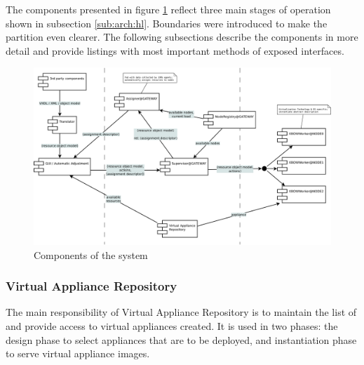 \documentclass[11pt]{book}
\begin{document}
        The components presented in figure \ref{fig:arch:comp} reflect three main stages of operation shown in
        subsection \ref{sub:arch:hl}. Boundaries were introduced to make the partition even clearer. The following
        subsections describe the components in more detail and provide listings with most important methods of exposed
        interfaces.

        \begin{figure}[H]
          \begin{center}
            \includegraphics[width=\textwidth]{img/architecture/iaas-components.pdf}
          \end{center}

          \caption{Components of the system}
          \label{fig:arch:comp}
        \end{figure}


        \subsubsection{Virtual Appliance Repository}

          The main responsibility of Virtual Appliance Repository is to maintain the list of and provide access to
          virtual appliances created. It is used in two phases: the design phase to select appliances that are to be
          deployed, and instantiation phase to serve virtual appliance images. \\

          \noindent
          \begin{minipage}{\textwidth}
            
          \end{minipage}
          
\end{document}
